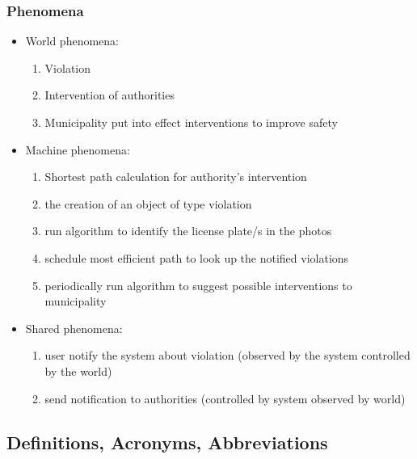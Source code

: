 \subsubsection{Phenomena}
\begin{itemize}
\item
World phenomena:
\begin{enumerate}
\item
Violation
\item
Intervention of authorities
\item
Municipality put into effect interventions to improve safety
\end{enumerate}
\item
Machine phenomena:	
\begin{enumerate}
\item
Shortest path calculation for authority’s intervention
\item
the creation of an object of type violation
\item
run algorithm to identify the license plate/s in the photos
\item
schedule most efficient path to look up the notified violations
\item
periodically run algorithm to suggest possible interventions to municipality
\end{enumerate}
\item
Shared phenomena:
\begin{enumerate}
\item
user notify the system about violation (observed by the system controlled by the world)
\item
send notification to authorities (controlled by system observed by world)
\end{enumerate}
\end{itemize}
\subsection{Definitions, Acronyms, Abbreviations}
